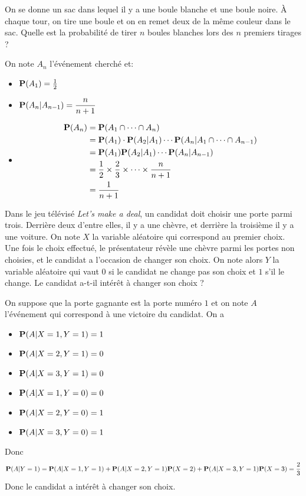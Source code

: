 \begin{ex}
    On se donne un sac dans lequel il y a une boule blanche et une boule noire. À chaque tour, on tire une boule et on en remet deux de la même couleur dans le sac. Quelle est la probabilité de tirer $n$ boules blanches lors des $n$ premiers tirages ?

    On note $A_n$ l'événement cherché et: \begin{itemize}
        \item $ \P(A_1)=\frac{1}{2}$
        \item $\P(A_n|A_{n-1})=\dfrac n{n+1}$
        \item \begin{align*}
                \P(A_n)&=\P(A_1\cap \cdots \cap A_n) \\ &= \P(A_1)\cdot \P(A_2|A_1)\cdots \P(A_n|A_1\cap\cdots \cap A_{n-1}) \\ &=\P(A_1)\P(A_2|A_1)\cdots \P(A_n|A_{n-1}) \\ &= \frac{1}{2} \times \frac{2}{3} \times \cdots \times \frac{n}{n+1}\\&=\frac{1}{n+1}
        \end{align*}
    \end{itemize}
\end{ex}

\begin{ex}
    Dans le jeu télévisé \emph{Let's make a deal}, un candidat doit choisir une porte parmi trois. Derrière deux d'entre elles, il y a une chèvre, et derrière la troisième il y a une voiture. On note $X$ la variable aléatoire qui correspond au premier choix. Une fois le choix effectué, le présentateur révèle une chèvre parmi les portes non choisies, et le candidat a l'occasion de changer son choix. On note alors $Y$ la variable aléatoire qui vaut $0$ si le candidat ne change pas son choix et $1$ s'il le change. Le candidat a-t-il intérêt à changer son choix ?

    On suppose que la porte gagnante est la porte numéro $1$ et on note $A$ l'événement qui correspond à une victoire du candidat. On a \begin{itemize}
        \item $\P(A|X=1,Y=1)=1$
        \item $\P(A|X=2,Y=1)=0$
        \item $\P(A|X=3,Y=1)=0$
        \item $\P(A|X=1,Y=0)=0$
        \item $\P(A|X=2,Y=0)=1$
        \item $\P(A|X=3,Y=0)=1$
    \end{itemize}
    Donc \[
        \P(A|Y=1)=\P(A|X=1,Y=1)+\P(A|X=2,Y=1)\P(X=2)+\P(A|X=3,Y=1)\P(X=3)=\frac{2}{3}
    \]
    Donc le candidat a intérêt à changer son choix.
\end{ex}

